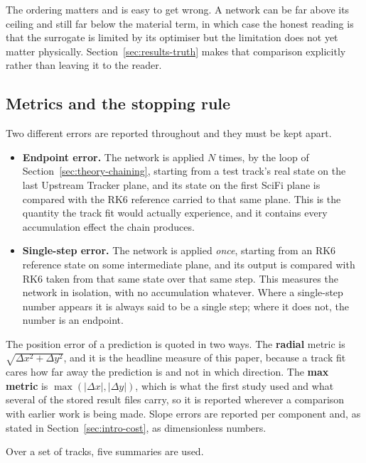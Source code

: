 \documentclass[11pt,a4paper]{article}
\begin{document}
The ordering matters and is easy to get wrong. A network can be far above its
ceiling and still far below the material term, in which case the honest reading
is that the surrogate is limited by its optimiser but the limitation does not
yet matter physically. Section~\ref{sec:results-truth} makes that comparison
explicitly rather than leaving it to the reader.

\subsection{Metrics and the stopping rule}
\label{sec:theory-metrics}

Two different errors are reported throughout and they must be kept apart.

\begin{itemize}
  \item \textbf{Endpoint error.} The network is applied $N$ times, by the loop
  of Section~\ref{sec:theory-chaining}, starting from a test track's real state
  on the last Upstream Tracker plane, and its state on the first SciFi plane is
  compared with the RK6 reference carried to that same plane. This is the
  quantity the track fit would actually experience, and it contains every
  accumulation effect the chain produces.
  \item \textbf{Single-step error.} The network is applied \emph{once},
  starting from an RK6 reference state on some intermediate plane, and its
  output is compared with RK6 taken from that same state over that same step.
  This measures the network in isolation, with no accumulation whatever. Where
  a single-step number appears it is always said to be a single step; where it
  does not, the number is an endpoint.
\end{itemize}

The position error of a prediction is quoted in two ways. The
\textbf{radial} metric is $\sqrt{\Delta x^2 + \Delta y^2}$, and it is the
headline measure of this paper, because a track fit cares how far away the
prediction is and not in which direction. The \textbf{max metric} is
$\max(|\Delta x|, |\Delta y|)$, which is what the first study used and what
several of the stored result files carry, so it is reported wherever a
comparison with earlier work is being made. Slope errors are reported per
component and, as stated in Section~\ref{sec:intro-cost}, as dimensionless
numbers.

Over a set of tracks, five summaries are used.
\end{document}
